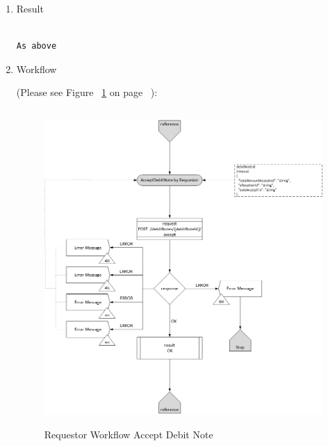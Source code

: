 \begin{enumerate}
\begin{table}[H]
\begin{center}
\begin{tabular}{|c|l|}
\end{tabular}
\end{center}

\end{table}

\item Result

\begin{tcolorbox}[boxrule=0pt, frame empty]
\begin{verbatim}

As above

\end{verbatim}
\end{tcolorbox}


\item Workflow

(Please see Figure ~\ref{fig:RADN} on page ~\pageref{fig:RADN}):

\begin{figure}[htbp]
    \centering
    \includegraphics[width=12cm,height=12cm,angle=0]{./diag/Workflow/Payment/AcceptDebitNote-R-Workflow.png}
    \caption{Requestor Workflow Accept Debit Note }
	\label{fig:RADN}
\end{figure}


\end{enumerate}

